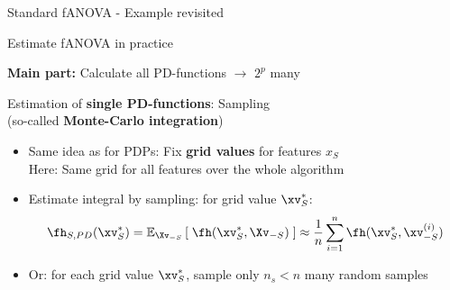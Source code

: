 \documentclass[11pt,compress,t,notes=noshow, aspectratio=169, xcolor=table]{beamer}
\begin{document}
\begin{frame}{Standard fANOVA - Example revisited}
\begin{example}
\begin{itemize}


    \end{itemize}
\end{example}
    
\end{frame}

\begin{frame}{Estimate fANOVA in practice
}

\textbf{Main part:} Calculate all PD-functions $\rightarrow$ $2^p$ many

Estimation of \textbf{single PD-functions}: Sampling \\
(so-called \textbf{Monte-Carlo integration})
\begin{itemize}
    \item Same idea as for PDPs: Fix \textbf{grid values} for features $x_S$ \\
    Here: Same grid for all features over the whole algorithm
    \item Estimate integral by sampling: for grid value $\xv_S^*$:
    $$
    \fh_{S, PD}(\xv_S^*) 
    = \mathbb{E}_{\Xv_{-S}} \left[ \; \fh(\xv_S^*, \Xv_{-S}) \; \right]
    \approx \frac{1}{n} \sum_{i=1}^n \fh(\xv_S^*, \xv_{-S}^{(i)})
    $$
    \item Or: for each grid value $\xv_S^*$, sample only $n_s < n$ many random samples
\end{itemize}


    
\end{frame}
\end{document}
